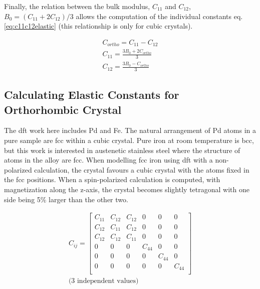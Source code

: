 Finally, the relation between the bulk modulus, $C_{11}$ and $C_{12}$, $B_0 = (C_{11} + 2 C_{12}) / 3$ allows the computation of the individual constants eq. \ref{eq:c11c12elastic} (this relationship is only for cubic crystals).

\begin{equation}
\begin{split}
C_{ortho} = C_{11} - C_{12} \\
C_{11} = \frac{3B_0 + 2 C_{ortho}}{3} \\
C_{12} = \frac{3B_0 - C_{ortho}}{3}
\end{split}
\label{eq:c11c12elastic}
\end{equation}



\subsection{Calculating Elastic Constants for Orthorhombic Crystal}
\label{section:calcelasticconstants}

The \acrshort{dft} work here includes Pd and Fe.  The natural arrangement of Pd atoms in a pure sample are \acrshort{fcc} within a cubic crystal.  Pure iron at room temperature is \acrshort{bcc}, but this work is interested in austenetic stainless steel where the structure of atoms in the alloy are \acrshort{fcc}.  When modelling \acrshort{fcc} iron using \acrshort{dft} with a non-polarized calculation, the crystal favours a cubic crystal with the atoms fixed in the \acrshort{fcc} positions.  When a spin-polarized calculation is computed, with magnetization along the z-axis, the crystal becomes slightly tetragonal with one side being 5\% larger than the other two.



\begin{equation}
    \begin{split}
      C_{ij} = 
      \begin{bmatrix}
      C_{11} & C_{12} & C_{12} & 0      & 0      & 0      \\
      C_{12} & C_{11} & C_{12} & 0      & 0      & 0      \\
      C_{12} & C_{12} & C_{11} & 0      & 0      & 0      \\
      0      & 0      & 0      & C_{44} & 0      & 0      \\
      0      & 0      & 0      & 0      & C_{44} & 0      \\
      0      & 0      & 0      & 0      & 0      & C_{44} \\
      \end{bmatrix}\\
      \text{(3 independent values)}
    \end{split}
  \label{eq:eqCubicEC}
\end{equation}


